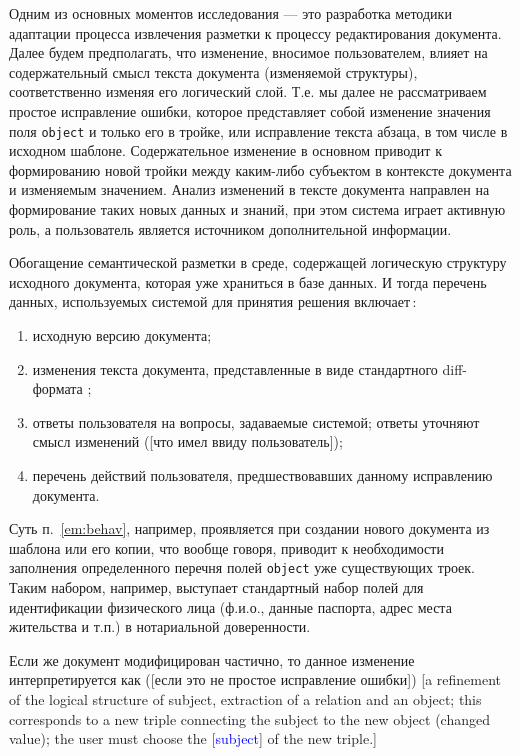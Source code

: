 \documentclass[utf8]{../IncArticle}
\newcommand{\e}[2][fcolor]{\textcolor{pcolor}{[}\textcolor{#1}{#2}\textcolor{pcolor}{]}}
\begin{document}
Одним из основных моментов исследования --- это разработка методики
адаптации процесса извлечения разметки к процессу редактирования
документа.  Далее будем предполагать, что изменение, вносимое
пользователем, влияет на содержательный смысл текста документа
(изменяемой структуры), соответственно изменяя его логический слой.
Т.е. мы далее не рассматриваем простое исправление ошибки, которое
представляет собой изменение значения поля \texttt{object} и только
его в тройке, или исправление текста абзаца, в том числе в исходном
шаблоне.  Содержательное изменение в основном приводит к формированию
новой тройки между каким-либо субъектом в контексте документа и
изменяемым значением.  Анализ изменений в тексте документа направлен
на формирование таких новых данных и знаний, при этом система играет
активную роль, а пользователь является источником дополнительной
информации.

Обогащение семантической разметки в среде, содержащей логическую
структуру исходного документа, которая уже храниться в базе данных.  И
тогда перечень данных, используемых системой для принятия решения
включает\,:
\begin{enumerate}
\item исходную версию документа;
\item изменения текста документа, представленные в виде стандартного
  diff-формата \cite{b9};
\item ответы пользователя на вопросы, задаваемые системой; ответы
  уточняют смысл изменений (\e{что имел ввиду пользователь});
\item перечень действий пользователя, предшествовавших данному
  исправлению документа. \label{em:behav}
\end{enumerate}
Суть п.~\ref{em:behav}, например, проявляется при создании нового
документа из шаблона или его копии, что вообще говоря, приводит к
необходимости заполнения определенного перечня полей \texttt{object}
уже существующих троек.  Таким набором, например, выступает
стандартный набор полей для идентификации физического лица (ф.и.о.,
данные паспорта, адрес места жительства и т.п.) в нотариальной
доверенности.

Если же документ модифицирован частично, то данное изменение
интерпретируется как (\e{если это не простое исправление ошибки}) \e{a refinement of the logical structure of subject, extraction of a relation and an object; this corresponds to a new triple connecting the subject to the new object (changed value); the user must choose the \e[blue]{subject} of the new triple.}
\end{document}
